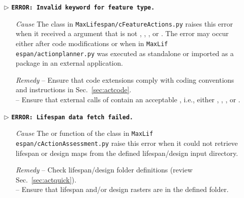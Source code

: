 \begin{itemize}
	\item[$\triangleright$]\textbf{\texttt{ERROR: Invalid keyword for feature type.}}
	\begin{itemize}
		\item[\textit{Cause}\hspace{0.27cm}] The  class in \texttt{MaxLifespan/cFeatureActions.py} raises this error when it received a  argument that is not , , , or . The error may occur either after code modifications or when  in \texttt{MaxLif espan/action{\myUnderscore}planner.py} was executed as standalone or imported as a package in an external application.
		\item[\textit{Remedy}] -- Ensure that code extensions comply with coding conventions and instructions in Sec.~\ref{sec:actcode}. \\
							   -- Ensure that external calls of  contain an acceptable , i.e.,  either , , , or .\\
	\end{itemize}
	
	\item[$\triangleright$]\textbf{\texttt{ERROR: Lifespan data fetch failed.}}
	\begin{itemize}
		\item[\textit{Cause}\hspace{0.27cm}] The  or  function of the  class in \texttt{MaxLif espan/cActionAssessment.py} raise this error when it could not retrieve lifespan or design maps from the defined lifespan/design input directory.
		\item[\textit{Remedy}] -- Check lifespan/design folder definitions (review Sec.~\ref{sec:actquick}).\\
							   -- Ensure that lifespan and/or design rasters are in the defined folder.\\
	\end{itemize}
	

\end{itemize}
